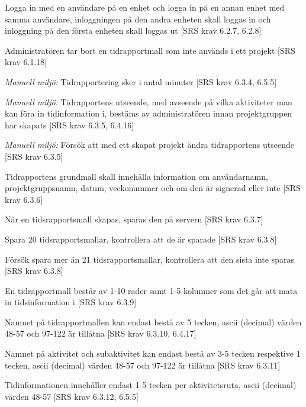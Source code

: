\documentclass[a4paper]{article}
\begin{document}
\begin{appendices}
\begin{FT}
\item 
Logga in med en användare på en enhet och logga in på en annan enhet med samma användare, inloggningen på den andra enheten skall loggas in och inloggning på den första enheten skall loggas ut [SRS krav 6.2.7, 6.2.8]

\item
Administratören tar bort en tidrapportmall som inte används i ett projekt [SRS krav 6.1.18]

\item
\emph{Manuell miljö:} Tidrapportering sker i antal minuter [SRS krav 6.3.4, 6.5.5]

\item
\emph{Manuell miljö:} Tidrapportens utseende, med avseende på vilka aktiviteter man kan föra in tidinformation i, bestäms av administratören innan projektgruppen har skapats [SRS krav 6.3.5, 6.4.16]

\item
\emph{Manuell miljö:} Försök att med ett skapat projekt ändra tidrapportens utseende [SRS krav 6.3.5]

\item
Tidrapportens grundmall skall innehålla information om användarnamn, projektgruppsnamn, datum, veckonummer och om den är signerad eller inte [SRS krav 6.3.6]

\item
När en tidsrapportsmall skapas, sparas den på servern [SRS krav 6.3.7]

\item
Spara 20 tidsrapportsmallar, kontrollera att de är sparade [SRS krav 6.3.8]

\item
Försök spara mer än 21 tidsrapportsmallar, kontrollera att den sista inte sparas [SRS krav 6.3.8]

\item
En tidrapportmall består av 1-10 rader samt 1-5 kolumner som det går att mata in tidsinformation i [SRS krav 6.3.9]

\item
Namnet på tidrapportmallen kan endast bestå av 5 tecken, ascii (decimal) värden 48-57 och
97-122 är tillåtna [SRS krav 6.3.10, 6.4.17]

\item
Namnet på aktivitet och subaktivitet kan endast bestå av 3-5 tecken respektive 1 tecken, ascii (decimal) värden 48-57 och 97-122 är tillåtna [SRS krav 6.3.11]

\item
Tidinformationen innehåller endast 1-5 tecken per aktivitetsruta, ascii (decimal) värden 48-57 [SRS krav 6.3.12, 6.5.5]


\end{FT}
\end{appendices}
\end{document}
